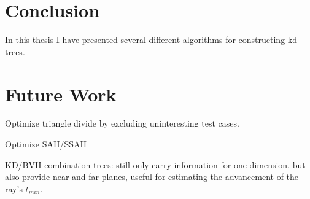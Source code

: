 \chapter{Conclusion}



In this thesis I have presented several different algorithms for constructing
kd-trees.

\chapter{Future Work}\label{chp:future}


Optimize triangle divide by excluding uninteresting test cases.

Optimize SAH/SSAH

KD/BVH combination trees: still only carry information for one
dimension, but also provide near and far planes, useful for estimating
the advancement of the ray's $t_{min}$.
